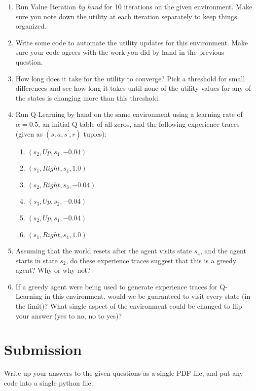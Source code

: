 \documentclass{article} %
\begin{document}
\begin{enumerate}
\item Run Value Iteration \emph{by hand} for 10 iterations on the given environment. Make sure you note down the utility at each iteration separately to keep things organized.
\item Write some code to automate the utility updates for this environment. Make sure your code agrees with the work you did by hand in the previous question.
\item How long does it take for the utility to converge? Pick a threshold for small differences and see how long it takes until none of the utility values for any of the states is changing more than this threshold.
\item Run Q-Learning by hand on the same environment using a learning rate of \(\alpha=0.5\), an initial Q-table of all zeros, and the following experience traces (given as \((s, a, s^\prime, r)\) tuples):
	\begin{enumerate}
		\item \((s_2, Up, s_1, -0.04)\)
		\item \((s_1, Right, s_4, 1.0)\)
		\item \((s_2, Right, s_3, -0.04)\)
		\item \((s_3, Up, s_2, -0.04)\)
		\item \((s_2, Up, s_1, -0.04)\)
		\item \((s_1, Right, s_4, 1.0)\)
	\end{enumerate}
\item Assuming that the world resets after the agent visits state \(s_4\), and the agent starts in state \(s_2\), do these experience traces suggest that this is a greedy agent? Why or why not?
\item If a greedy agent were being used to generate experience traces for Q-Learning in this environment, would we be guaranteed to visit every state (in the limit)? What single aspect of the environment could be changed to flip your answer (yes to no, no to yes)?
\end{enumerate}

\section*{Submission}
Write up your answers to the given questions as a single PDF file, and put any code into a single python file.
\end{document}

